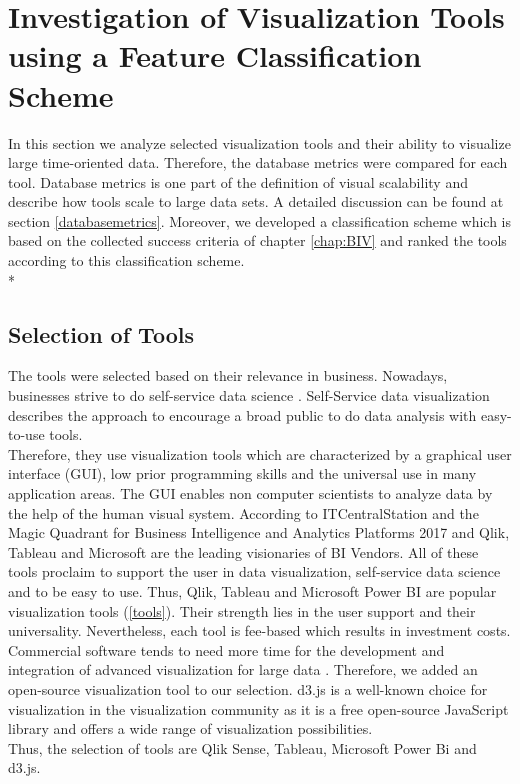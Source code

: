 \chapter{Investigation of Visualization Tools using a Feature Classification Scheme}
\label{chap:Tools}

In this section we analyze selected visualization tools and their ability to visualize large time-oriented data. Therefore, the database metrics were compared for each tool. Database metrics is one part of the definition of visual scalability and describe how tools scale to large data sets. A detailed discussion can be found at section \ref{databasemetrics}. Moreover, we developed a classification scheme which is based on the collected success criteria of chapter \ref{chap:BIV} and ranked the tools according to this classification scheme. \\*

\section{Selection of Tools}\label{tool:selection}
The tools were selected based on their relevance in business. Nowadays, businesses strive to do self-service data science \cite{Russom2011,Parenteau2016,SAS2012,Curran2005}. Self-Service data visualization describes the approach to encourage a broad public to do data analysis with easy-to-use tools.\\ Therefore, they use visualization tools which are characterized by a graphical user interface  (GUI), low prior programming skills and the universal use in many application areas. The GUI enables non computer scientists to analyze data by the help of the human visual system. According to ITCentralStation and the Magic Quadrant for Business Intelligence and Analytics Platforms 2017  \cite{ITCentralStation2017, Sallam2017} and  Qlik, Tableau and Microsoft are the leading visionaries of BI Vendors. All of these tools proclaim to support the user in data visualization, self-service data science and to be easy to use. Thus, Qlik, Tableau and Microsoft Power BI are popular visualization tools  (\ref{tools}). Their strength lies in the user support and their universality. Nevertheless, each tool is fee-based which results in investment costs. \\
Commercial software tends to need more time for the development and integration of advanced visualization for large data  \cite{Zhang2012, Simon2014}. Therefore, we added an open-source visualization tool to our selection. d3.js is a well-known choice for visualization in the visualization community as it is a free open-source JavaScript library and offers a wide range of visualization possibilities. \\
Thus, the selection of tools are Qlik Sense, Tableau, Microsoft Power Bi and d3.js.

